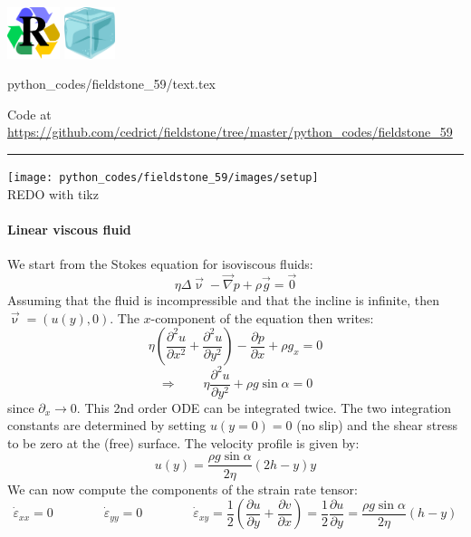 
\includegraphics[height=1.5cm]{images/pictograms/replication}
\includegraphics[height=1.5cm]{images/pictograms/ice}

\begin{flushright} {\tiny {\color{gray} python\_codes/fieldstone\_59/text.tex}} \end{flushright}



\begin{center}
Code at \url{https://github.com/cedrict/fieldstone/tree/master/python_codes/fieldstone_59}
\end{center}

\par\noindent\rule{\textwidth}{0.4pt}





\begin{center}
\texttt{[image: python\_codes/fieldstone\_59/images/setup]}\\
{\captionfont REDO with tikz}
\end{center}

\paragraph{Linear viscous fluid}

We start from the Stokes equation for isoviscous fluids:
\[
\eta \Delta \vec{\upnu} - \vec\nabla p + \rho \vec{g} = \vec{0}
\]
Assuming that the fluid is incompressible and that the incline is infinite, 
then $\vec{\upnu}=(u(y),0)$.
The $x$-component of the equation then writes:
\[
\eta\left(\frac{\partial^2 u}{\partial x^2}+\frac{\partial^2 u}{\partial y^2} \right)
- \frac{\partial p}{\partial x} + \rho g_x =0
\]
\[
\Rightarrow \qquad 
\eta\frac{\partial^2 u}{\partial y^2} 
+ \rho g \sin\alpha =0
\]
since $\partial_x\rightarrow 0$.
This 2nd order ODE can be integrated twice. The two integration constants are 
determined by setting $u(y=0)=0$ (no slip) and the shear stress to be zero at the (free)
surface. The velocity profile is given by:
\[
u(y)=\frac{\rho g \sin \alpha}{2 \eta} (2h-y)y
\]
We can now compute the components of the strain rate tensor:
\[
\dot{\varepsilon}_{xx}=0
\qquad
\qquad
\dot{\varepsilon}_{yy}=0
\qquad
\qquad
\dot{\varepsilon}_{xy}
=\frac{1}{2} \left( \frac{\partial u}{\partial y} + \frac{\partial v}{\partial x} \right)
=\frac{1}{2} \frac{\partial u}{\partial y} 
= \frac{\rho g \sin \alpha}{2 \eta} (h-y)
\]


